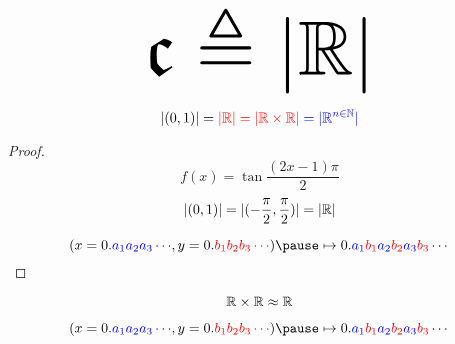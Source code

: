 %
%
%
%
%

\begin{frame}{}
  \[
    \scalebox{5.5}{$\mathfrak{c} \triangleq |\R|$}
  \]
\end{frame}

\begin{frame}{}
  \begin{theorem}[$|\R|$ (Cantor 1877)]
    \[
      |(0,1)| = \textcolor{red}{|\mathbb{R}| = |\mathbb{R} \times \mathbb{R}|} \textcolor{blue}{\;= |\mathbb{R}^{n \in \mathbb{N}}|}
    \]
  \end{theorem}

  \pause
  \begin{proof}
    \pause
    \[
      f(x) = \tan \frac{(2x-1)\pi}{2}
    \]
    \[
      |(0,1)| = |(-\frac{\pi}{2}, \frac{\pi}{2})| = |\mathbb{R}|
    \]

    \pause
    \[
      (x = 0.\blue{a_1 a_2 a_3 \cdots}, y = 0.\red{b_1 b_2 b_3 \cdots}) \pause \mapsto 0.\blue{a_1}\red{b_1}\blue{a_2}\red{b_2}\blue{a_3}\red{b_3}\cdots
    \]
  \end{proof}
\end{frame}

\begin{frame}{}
  \[
    \mathbb{R} \times \mathbb{R} \approx \mathbb{R}
  \]

  \pause
  \[
    (x = 0.\blue{a_1 a_2 a_3 \cdots}, y = 0.\red{b_1 b_2 b_3 \cdots}) \pause \mapsto 0.\blue{a_1}\red{b_1}\blue{a_2}\red{b_2}\blue{a_3}\red{b_3}\cdots
  \]

  \pause

  \begin{center}
    \href{https://www.maa.org/sites/default/files/pdf/pubs/AMM-March11\_Cantor.pdf}{}
  \end{center}
\end{frame}

